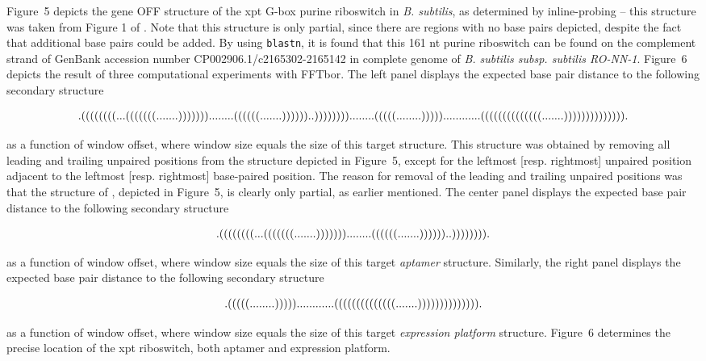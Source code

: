 Figure~5 depicts the gene OFF structure of the
xpt G-box purine riboswitch in {\em B. subtilis}, as determined by
inline-probing -- this structure was taken from
Figure 1 of \cite{breaker:Riboswitch2}.
Note that this structure is only partial, since there are regions
with no base pairs depicted, despite the fact that additional
base pairs could be added. By using
{\tt blastn}, it is found that this 161 nt purine riboswitch
can be found on the complement strand of GenBank accession number
CP002906.1/c2165302-2165142 in
complete genome of {\em B. subtilis subsp. subtilis RO-NN-1}.
Figure~6 depicts the result of
three computational experiments with FFTbor. The left panel displays
the expected base pair distance to the following secondary structure
\begin{small}
\begin{eqnarray}
\label{eq:xpt1}
\bf
.((((((((...(((((((.......)))))))........((((((.......))))))..))))))))........(((((........)))))............((((((((((((((.......)))))))))))))).
\end{eqnarray}
\end{small}
as a function of window offset, where window size equals the size of this
target structure. This structure was
obtained by removing all leading and trailing unpaired positions
from the structure depicted in Figure~5,
except for the leftmost [resp. rightmost] unpaired position
adjacent to the leftmost [resp. rightmost] base-paired position.
The reason for removal of the leading and trailing unpaired positions was
that the structure of \cite{breaker:Riboswitch2}, depicted in
Figure~5, is clearly only partial, as earlier
mentioned.  The center panel displays
the expected base pair distance to the following secondary structure
\begin{small}
\begin{eqnarray}
\label{eq:xpt2}
\bf
.((((((((...(((((((.......)))))))........((((((.......))))))..)))))))).
\end{eqnarray}
\end{small}
as a function of window offset, where window size equals the size of this
target {\em aptamer} structure. Similarly, the right panel displays
the expected base pair distance to the following secondary structure
\begin{small}
\begin{eqnarray}
\label{eq:xpt3}
\bf
.(((((........)))))............((((((((((((((.......)))))))))))))).
\end{eqnarray}
\end{small}
as a function of window offset, where window size equals the size of this
target {\em expression platform} structure.
Figure~6 determines the precise location of the
xpt riboswitch, both aptamer and expression platform.

